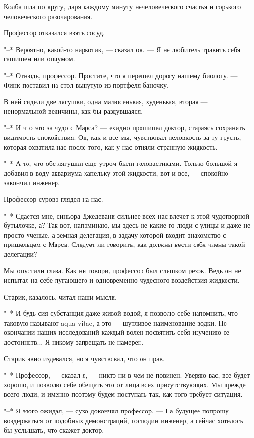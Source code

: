 Колба шла по кругу,  даря  каждому  минуту  нечеловеческого  счастья  и
горького человеческого разочарования.

Профессор отказался взять сосуд.

"--* Вероятно, какой-то наркотик, --- сказал он. ---  Я  не  любитель  травить
себя гашишем или опиумом.

"--* Отнюдь, профессор. Простите, что я перешел дорогу нашему  биологу.  ---
Финк поставил на стол вынутую из портфеля баночку.

В ней  сидели  две  лягушки,  одна  малюсенькая,  худенькая,  вторая  ---
ненормальной величины, как бы раздувшаяся.

"--* И что это за  чудо  с  Марса?  ---  ехидно  прошипел  доктор,  стараясь
сохранять видимость спокойствия. Он, как и все мы,  чувствовал  неловкость
за ту грусть, которая охватила нас после того, как у нас  отняли  странную
жидкость.

"--* А то, что обе лягушки еще утром были головастиками. Только большой  я
добавил в воду аквариума капельку этой жидкости, вот  и  все,  ---  спокойно
закончил инженер.

Профессор сурово глядел на нас.

"--* Сдается мне,  синьора  Джедевани  сильнее  всех  нас  влечет  к  этой
чудотворной бутылочке, а? Так вот, напоминаю, мы здесь не какие-то люди  с
улицы и даже не просто ученые, а земная делегация, в задачу которой входит
знакомство с пришельцем с Марса. Следует ли  говорить,  как  должны  вести
себя члены такой делегации?

Мы опустили глаза. Как ни говори, профессор был слишком резок. Ведь  он
не  испытал  на  себе  пугающего  и  одновременно  чудесного   воздействия
жидкости.

Старик, казалось, читал наши мысли.

"--* И будь сия субстанция даже живой водой, я позволю себе напомнить, что
таковую называют aqua vitae, а  это  ---  шутливое  наименование  водки.  По
окончании наших исследований  каждый  волен  посвятить  себя  изучению  ее
достоинств... Я никому запрещать не намерен.

Старик явно издевался, но я чувствовал, что он прав.

"--* Профессор, --- сказал я, --- никто ни в чем не повинен. Уверяю  вас,  все
будет хорошо, и позволю себе обещать это от лица всех  присутствующих.  Мы
прежде всего люди, и именно поэтому будем поступать так, как того  требует
ситуация.

"--* Я этого ожидал, --- сухо  докончил  профессор.  ---  На  будущее  попрошу
воздержаться от подобных демонстраций, господин инженер, а сейчас хотелось
бы услышать, что скажет доктор.

